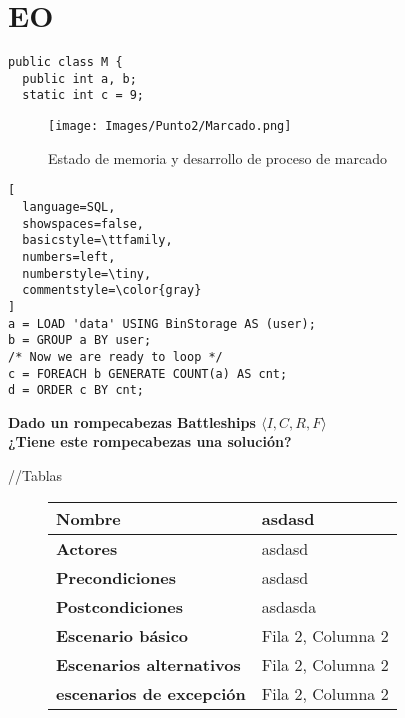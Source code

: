 \section{EO}
\begin{lstlisting}[style=java,caption= Metodo ordenarPorConteoChar]
  public class M { 
  public int a, b;
  static int c = 9; 
 \end{lstlisting}

 \begin{figure}[!htb]
  \centering
  \texttt{[image: Images/Punto2/Marcado.png]}
  \caption{Estado de memoria y desarrollo de proceso de marcado}
  \label{fig:marcado}
\end{figure}





 \begin{lstlisting}[
  language=SQL,
  showspaces=false,
  basicstyle=\ttfamily,
  numbers=left,
  numberstyle=\tiny,
  commentstyle=\color{gray}
]
a = LOAD 'data' USING BinStorage AS (user);
b = GROUP a BY user;
/* Now we are ready to loop */
c = FOREACH b GENERATE COUNT(a) AS cnt;
d = ORDER c BY cnt;
\end{lstlisting}


\begin{tcolorbox}
  \begin{center}
   \textbf{Dado un rompecabezas Battleships $\langle I, C, R, F\rangle$ \\ ¿Tiene este rompecabezas una solución?}
  \end{center}
\end{tcolorbox}


//Tablas
\begin{figure}[htb]
  \centering
  \scriptsize %
  \small
  \begin{tabular}{| p{4.5 cm} | p{12 cm} |}
  \hline
  \textbf{Nombre} & asdasd \\
  \hline
  \textbf{Actores}  & asdasd \\
  \hline
  \textbf{Precondiciones} & asdasd \\
  \hline
  \textbf{Postcondiciones} & asdasda \\
  \hline
  \textbf{Escenario básico} & Fila 2, Columna 2 \\
  \hline
  \textbf{Escenarios alternativos} & Fila 2, Columna 2 \\
  \hline
  \textbf{escenarios de excepción} & Fila 2, Columna 2 \\
  \hline
  \end{tabular}
\end{figure}